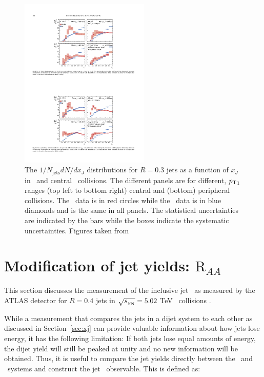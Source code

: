 \begin{figure}[htbp]
\begin{center}
\includegraphics[width=0.55\textwidth]{figures/jetMeasurements/xJ_R03}
\caption{The $1/N_\mathrm{jets} dN/dx_J$ distributions for $R=0.3$ jets as a function of $x_J$ in \pp\ and central \pbpb\ collisions. The different panels are for different, $\mbox{$p_{\mathrm{T}}$}_1$ ranges (top left to bottom right) central and (bottom) peripheral collisions. The \pbpb\ data is in red circles while the \pp\ data is in blue diamonds and is the same in all panels. The statistical uncertainties are indicated by the bars while the boxes indicate the systematic uncertainties. Figures taken from \cite{Aaboud:2017eww}}
\label{fig:xJ_R03}
\end{center}
\end{figure}

\section{Modification of jet yields: $\mathrm{R}_{AA}$}
\label{sec:jet_raa}

This section discusses the measurement of the inclusive jet \RAA\ as measured by the ATLAS detector for $R=0.4$ jets in $\mbox{$\sqrt{s_{_\text{NN}}}$}=5.02$ TeV \pbpb\ collisions \cite{2019108}.

While a measurement that compares the jets in a dijet system to each other as discussed in Section~\ref{sec:xj} can provide valuable information about how jets lose energy, it has the following limitation: If both jets lose equal amounts of energy, the dijet yield will still be peaked at unity and no new information will be obtained. Thus, it is useful to compare the jet yields directly between the \pp\ and \pbpb\ systems and construct the jet \RAA\ observable. This is defined as:

